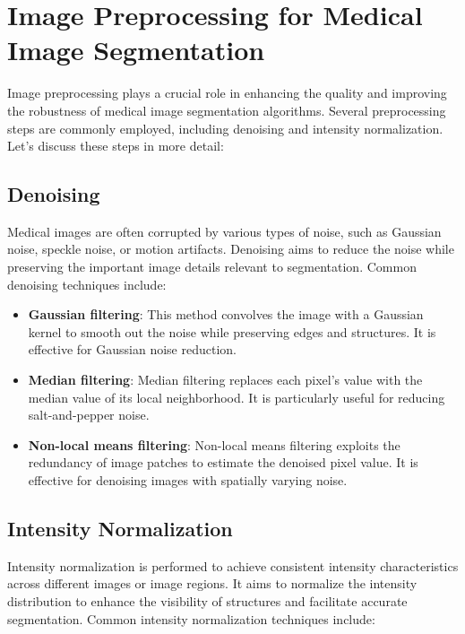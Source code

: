 \documentclass[]{report}
\begin{document}
\section*{Image Preprocessing for Medical Image Segmentation}

Image preprocessing plays a crucial role in enhancing the quality and improving the robustness of medical image segmentation algorithms. Several preprocessing steps are commonly employed, including denoising and intensity normalization. Let's discuss these steps in more detail:

\subsection*{Denoising}

Medical images are often corrupted by various types of noise, such as Gaussian noise, speckle noise, or motion artifacts. Denoising aims to reduce the noise while preserving the important image details relevant to segmentation. Common denoising techniques include:

\begin{itemize}
\item \textbf{Gaussian filtering}: This method convolves the image with a Gaussian kernel to smooth out the noise while preserving edges and structures. It is effective for Gaussian noise reduction.

\item \textbf{Median filtering}: Median filtering replaces each pixel's value with the median value of its local neighborhood. It is particularly useful for reducing salt-and-pepper noise.

\item \textbf{Non-local means filtering}: Non-local means filtering exploits the redundancy of image patches to estimate the denoised pixel value. It is effective for denoising images with spatially varying noise.
\end{itemize}

\subsection*{Intensity Normalization}

Intensity normalization is performed to achieve consistent intensity characteristics across different images or image regions. It aims to normalize the intensity distribution to enhance the visibility of structures and facilitate accurate segmentation. Common intensity normalization techniques include:
\end{document}
